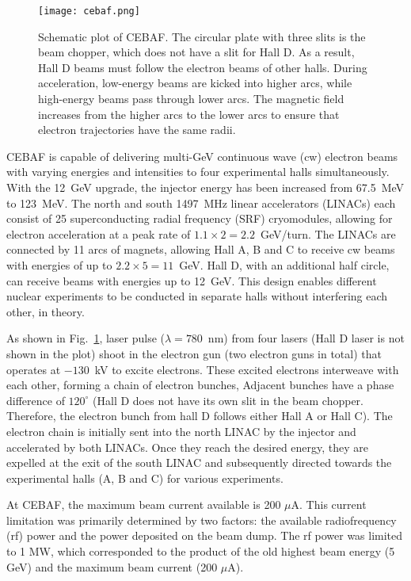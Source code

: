 \begin{figure}[!h]
    \texttt{[image: cebaf.png]}
    \caption[CEBAF]
    {Schematic plot of CEBAF. The circular plate with three slits is the beam chopper,
    which does not have a slit for Hall D. As a result, Hall D beams must follow 
    the electron beams of other halls. During acceleration, low-energy beams are kicked into 
    higher arcs, while high-energy beams pass through lower arcs. The magnetic
    field increases from the higher arcs to the lower arcs to ensure that electron trajectories
    have the same radii.}
    \label{fig:cebaf}
\end{figure}
CEBAF is capable of delivering multi-GeV continuous wave (cw) electron beams with
varying energies and intensities to four experimental halls simultaneously.
With the 12~GeV upgrade, the injector energy has been increased from 67.5~MeV to 
123~MeV. The north and south 1497~MHz linear accelerators (LINACs) each consist of 25 
superconducting radial frequency (SRF) cryomodules, allowing for electron acceleration
at a peak rate of $1.1 \times 2 = 2.2$~GeV/turn. The LINACs are connected 
by 11 arcs of magnets, allowing Hall A, B and C to receive cw beams with energies 
of up to $2.2 \times 5 = 11$~GeV. Hall D, with an additional half circle,
can receive beams with energies up to 12~GeV. This design enables different nuclear 
experiments to be conducted in separate halls without interfering each other,
in theory.

As shown in Fig.~\ref{fig:cebaf}, laser pulse ($\lambda = 780$~nm) from four lasers 
(Hall D laser is not shown in the plot) shoot in the electron gun 
(two electron guns in total) that operates at $-130$~kV to excite electrons. 
These excited electrons interweave with each other, forming a chain of electron bunches, 
Adjacent bunches have a phase difference of $120^\circ$ (Hall D does not have 
its own slit in the beam chopper. Therefore, the electron bunch from hall D 
follows either Hall A or Hall C). The electron chain is initially sent into the 
north LINAC by the injector and accelerated by both LINACs. Once they reach the desired energy,
they are expelled at the exit of the south LINAC and subsequently directed towards 
the experimental halls (A, B and C) for various experiments. 

At CEBAF, the maximum beam current available is 200 $\mu$A. This current limitation was primarily determined by two factors: the available radiofrequency (rf) power and the power deposited on the beam dump. The rf power was limited to 1 MW, which corresponded to the product of the old highest beam energy (5 GeV) and the maximum beam current (200 $\mu$A).

